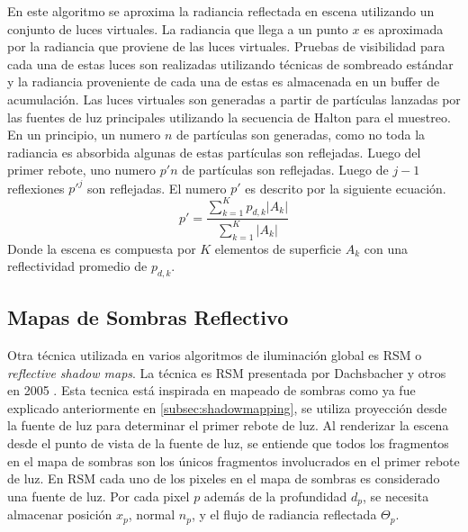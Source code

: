 En este algoritmo se aproxima la radiancia reflectada en escena utilizando un conjunto de luces virtuales. La radiancia que llega a un punto $x$ es aproximada por la radiancia que proviene de las luces virtuales. Pruebas de visibilidad para cada una de estas luces son realizadas utilizando técnicas de sombreado estándar y la radiancia proveniente de cada una de estas es almacenada en un buffer de acumulación.
Las luces virtuales son generadas a partir de partículas lanzadas por las fuentes de luz principales utilizando la secuencia de Halton para el muestreo. En un principio, un numero $n$ de partículas son generadas, como no toda la radiancia es absorbida algunas de estas partículas son reflejadas. Luego del primer rebote, uno numero $p'n$ de partículas son reflejadas. Luego de $j-1$ reflexiones $p'^j$ son reflejadas. El numero $p'$ es descrito por la siguiente ecuación.
\begin{equation}
    p' = \frac{\sum_{k=1}^{K} p_{d,k}|A_{k}|}{\sum_{k=1}^{K}|A_{k}|}
    \label{eq:reflected_vpls}
\end{equation}
Donde la escena es compuesta por $K$ elementos de superficie $A_{k}$ con una reflectividad promedio de $p_{d,k}$.

\subsection{Mapas de Sombras Reflectivo}
Otra técnica utilizada en varios algoritmos de iluminación global es \ac{RSM} o \emph{reflective shadow maps}. La técnica es \ac{RSM} presentada por Dachsbacher y otros en 2005 \cite{Dachsbacher:2005}.  Esta tecnica está inspirada en mapeado de sombras como ya fue explicado anteriormente en \ref{subsec:shadowmapping}, se utiliza proyección desde la fuente de luz para determinar el primer rebote de luz. Al renderizar la escena desde el punto de vista de la fuente de luz, se entiende que todos los fragmentos en el mapa de sombras son los únicos fragmentos involucrados en el primer rebote de luz. En \ac{RSM} cada uno de los pixeles en el mapa de sombras es considerado una fuente de luz. Por cada pixel $p$ además de la profundidad $d_{p}$, se necesita almacenar posición $x_{p}$, normal $n_{p}$, y el flujo de radiancia reflectada $\Theta_{p}$.

